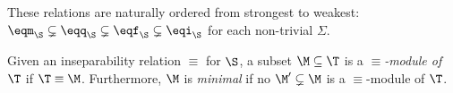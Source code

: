 These relations are naturally ordered
from strongest to weakest:
${\eqm_{\S}}\subsetneq{\eqq_{\S}}\subsetneq{\eqf_{\S}}\subsetneq{\eqi_{\S}}$
for each
non-trivial $\Sigma$.
 

Given an inseparability relation $\equiv$ for $\S$, 
a subset $\M\subseteq \T$ is a \emph{$\equiv$-module of\/
$\T$} if $\T\equiv \M$. Furthermore, $\M$ is \emph{minimal}
if no $\M' \subsetneq \M$ is a $\equiv$-module of\/
$\T$.
